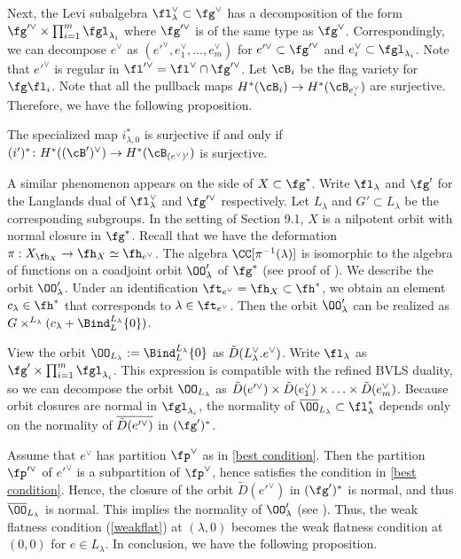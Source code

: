 \documentclass[12pt]{amsart}
\begin{document}
Next, the Levi subalgebra $\fl^{\vee}_\lambda\subset \fg^\vee$ has a decomposition of the form $\fg'^{\vee}\times \prod_{i=1}^{m} \fgl_{\lambda_i}$ where $\fg'^{\vee}$ is of the same type as $\fg^\vee$. Correspondingly, we can decompose $e^\vee$ as $(e'^{\vee},e^{\vee}_1,...,e^{\vee}_m)$ for $e'^{\vee}\subset \fg'^{\vee}$ and $e^{\vee}_i\subset \fgl_{\lambda_i}$. Note that $e'^{\vee}$ is regular in $\fl'^\vee = \fl^\vee \cap \fg'^\vee$. Let $\cB_i$ be the flag variety for $\fg\fl_i$. Note that all the pullback maps $H^*(\cB_i)\rightarrow H^*(\cB_{e^{\vee}_i})$ are surjective. Therefore, we have the following proposition.

\begin{prop} \label{non gl factor coh}
    The specialized map $i^{*}_{\lambda, 0}$ is surjective if and only if $(i')^*\colon H^*((\cB')^\vee)\rightarrow H^*(\cB_{(e^\vee)'})$ is surjective. 
\end{prop}
A similar phenomenon appears on the side of $X\subset \fg^*$. Write $\fl_\lambda$ and $\fg'$ for the Langlands dual of $\fl^{\vee}_\lambda$ and $\fg'^\vee$ respectively. Let $L_\lambda$ and $G'\subset L_\lambda$ be the corresponding subgroups. In the setting of Section 9.1, $X$ is a nilpotent orbit with normal closure in $\fg^*$. Recall that we have the deformation $\pi: X_{\fh_X}\rightarrow \fh_X\simeq \fh_{e^{\vee}}$. The algebra $\CC[\pi^{-1}(\lambda)]$ is isomorphic to the algebra of functions on a coadjoint orbit $\OO'_{\lambda}$ of $\fg^*$ (see proof of \cite[Proposition 4.5]{Losev4}). We describe the orbit $\OO'_{\lambda}$.  Under an identification $\ft_{e^\vee} =\fh_X\subset \fh^*$, we obtain an element $c_\lambda\in \fh^*$ that corresponds to $\lambda\in \ft_{e^\vee}$. Then the orbit $\OO'_{\lambda}$ can be realized as $G\times^{L_\lambda} (c_\lambda+ \Bind_L^{L_\lambda} \{0\})$. 

View the orbit $\OO_{L_\lambda}:= \Bind_L^{L_\lambda} \{0\}$ as $\Tilde{D}(L^\vee_\lambda. e^\vee)$. Write $\fl_\lambda$ as $\fg'\times \prod_{i=1}^{m} \fgl_{\lambda_i}$. This expression is compatible with the refined BVLS duality, so we can decompose the orbit $\OO_{L_\lambda}$ as $\Tilde{D}(e'^{\vee})\times \Tilde{D}(e^{\vee}_1)\times \ldots\times \Tilde{D}(e^{\vee}_m)$. Because orbit closures are normal in $\fgl_{\lambda_i}$, the normality of $\overline{\OO}_{L_\lambda}\subset \fl_\lambda^*$ depends only on the normality of $\overline{\Tilde{D}(e'^{\vee})}$ in $(\fg')^*$. 

Assume that $e^\vee$ has partition $\fp^\vee$ as in \cref{best condition}. 
Then the partition $\fp'^\vee$ of $e'^\vee$ is a subpartition of $\fp^\vee$, hence satisfies the condition in \cref{best condition}.
Hence, the closure of the orbit $\widetilde{D}(e'^{\vee})$ in $(\fg')^*$ is normal, and thus $\overline{\OO}_{L_\lambda}$ is normal.
This implies the normality of $\OO'_{\lambda}$ (see \cite[Section 1]{Hesselink1979}). Thus, the weak flatness condition (\ref{weakflat}) at $(\lambda, 0)$ becomes the weak flatness condition at $(0,0)$ for $e\in L_\lambda$. In conclusion, we have the following proposition.
\end{document}
